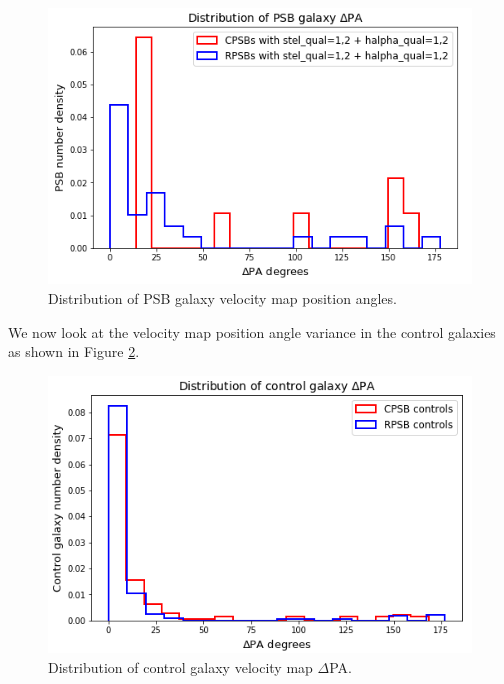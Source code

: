 \begin{figure}
    \centering
    \includegraphics[width=\columnwidth]{images/JupyterPlots/Distribution-of-PSB-deltaPA.png}
    \caption{Distribution of PSB galaxy velocity map position angles.}
    \label{fig:deltaPAdistribution}
\end{figure}

We now look at the velocity map position angle variance in the control galaxies as shown in Figure \ref{fig:controlDeltaPAs}.

\begin{figure}
    \centering
    \includegraphics[width=\columnwidth]{images/JupyterPlots/Distribution-of-control-galaxy-deltaPA.png}
    \caption{Distribution of control galaxy velocity map $\Delta$PA.}
    \label{fig:controlDeltaPAs}
\end{figure}

